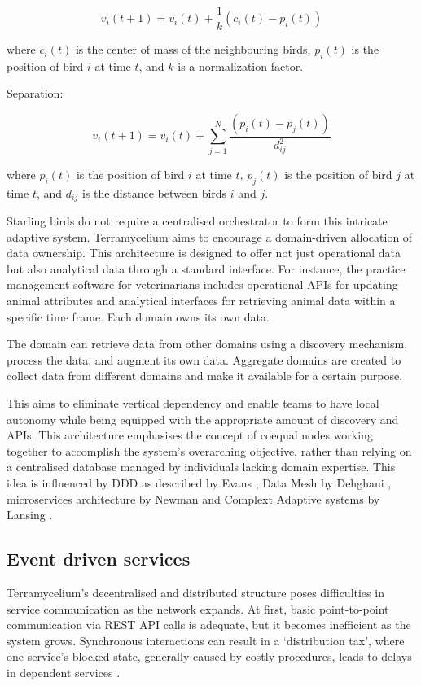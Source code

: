 \documentclass{ieeeaccess}
\begin{document}
$$ v_i(t+1) = v_i(t) + \frac{1}{k} (c_i(t) - p_i(t)) $$

where $c_i(t)$ is the center of mass of the neighbouring birds, $p_i(t)$ is the position of bird $i$ at time $t$, and $k$ is a normalization factor.

Separation:

$$ v_i(t+1) = v_i(t) + \sum_{j=1}^{N} \frac{(p_i(t) - p_j(t))}{d_{ij}^2} $$

where $p_i(t)$ is the position of bird $i$ at time $t$, $p_j(t)$ is the position of bird $j$ at time $t$, and $d_{ij}$ is the distance between birds $i$ and $j$.

Starling birds do not require a centralised orchestrator to form this intricate adaptive system. Terramycelium aims to encourage a domain-driven allocation of data ownership. This architecture is designed to offer not just operational data but also analytical data through a standard interface. For instance, the practice management software for veterinarians includes operational APIs for updating animal attributes and analytical interfaces for retrieving animal data within a specific time frame. Each domain owns its own data.

The domain can retrieve data from other domains using a discovery mechanism, process the data, and augment its own data. Aggregate domains are created to collect data from different domains and make it available for a certain purpose. 

This aims to eliminate vertical dependency and enable teams to have local autonomy while being equipped with the appropriate amount of discovery and APIs. This architecture emphasises the concept of coequal nodes working together to accomplish the system's overarching objective, rather than relying on a centralised database managed by individuals lacking domain expertise. This idea is influenced by DDD as described by Evans \cite{evans2004domain}, Data Mesh by Dehghani \cite{DataMesh}, microservices architecture by Newman \cite{newman2021building} and Complext Adaptive systems by Lansing \cite{lansing2003complex}. 

\subsection{Event driven services}

Terramycelium's decentralised and distributed structure poses difficulties in service communication as the network expands. At first, basic point-to-point communication via REST API calls is adequate, but it becomes inefficient as the system grows. Synchronous interactions can result in a `distribution tax', where one service's blocked state, generally caused by costly procedures, leads to delays in dependent services \cite{montesi2016circuit}.
\end{document}
